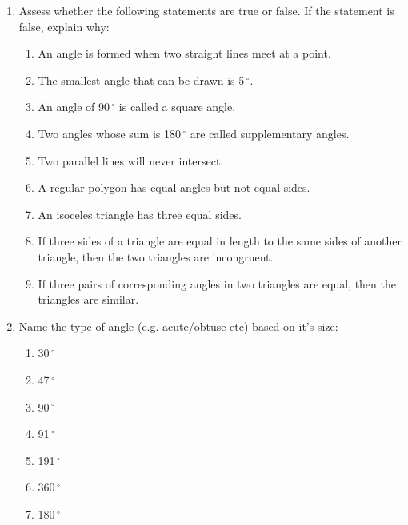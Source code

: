 \begin{table}[H]
\begin{enumerate}[noitemsep,
label=\textbf{\arabic*}. ]
\begin{figure}[H]
\begin{center}
    
    \end{center}

 \end{figure}   

    \addtocounter{footnote}{-0}
    
        
\label{m38380*uid142}\item Assess whether the following statements are true or
false. If the statement is false, explain why:
\label{m38380*id401234}\begin{enumerate}[noitemsep, label=\textbf{\alph*}. ] 
            \item An angle is formed when two straight lines meet at a point.
\item The smallest angle that can be drawn is 5\ensuremath{{\,}^{\circ}}.\item
An angle of 90\ensuremath{{\,}^{\circ}} is called a square angle.\item Two
angles whose sum is 180\ensuremath{{\,}^{\circ}} are called supplementary
angles.\item Two parallel lines will never intersect.\item A regular polygon has
equal angles but not equal sides.\item An isoceles triangle has three equal
sides.\item If three sides of a triangle are equal in length to the same sides
of another triangle, then the two triangles are incongruent.\item If three pairs
of corresponding angles in two triangles are equal, then the triangles are
similar.\end{enumerate}
        
        
\label{m38380*uid143}\item Name the type of angle (e.g. acute/obtuse etc) based
on it's size:
\label{m38380*id401235}\begin{enumerate}[noitemsep, label=\textbf{\alph*}. ] 
            \item  30\ensuremath{{\,}^{\circ}}\item 
47\ensuremath{{\,}^{\circ}}\item  90\ensuremath{{\,}^{\circ}}\item 
91\ensuremath{{\,}^{\circ}}\item  191\ensuremath{{\,}^{\circ}}\item 
360\ensuremath{{\,}^{\circ}}\item  180\ensuremath{{\,}^{\circ}}\end{enumerate}
        

\end{enumerate}
\end{table}
